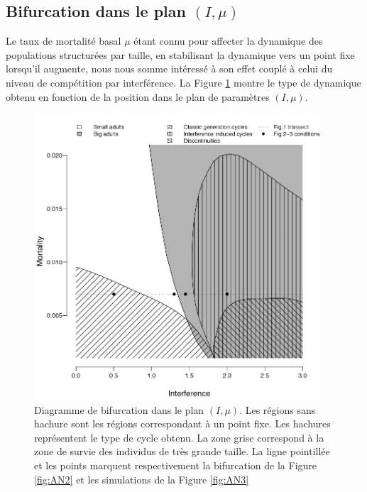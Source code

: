 \subsection{Bifurcation dans le plan $(I,\mu)$}

Le taux de mortalité basal $\mu$ étant connu pour affecter la dynamique des
populations structurées par taille, en stabilisant la dynamique vers un point
fixe lorsqu'il augmente, nous nous somme intéressé à son effet couplé à celui du
niveau de compétition par interférence. La Figure \ref{fig:AN4} montre le type
de dynamique obtenu en fonction de la position dans le plan de paramètres
$(I,\mu)$.

\begin{figure}[!ht]
\begin{center}
\includegraphics[width=0.95\textwidth]{1_CorpsDeThese/Resumes/Fig/AN05}
\caption[Diagramme de
bifurcation dans le plan $(I,\mu)$]{Diagramme de
bifurcation dans le plan $(I,\mu)$. Les régions sans hachure sont les régions
correspondant à un point fixe. Les hachures représentent le type de cycle
obtenu. La zone grise correspond à la zone de survie des individus de très
grande taille. La ligne pointillée et les points marquent respectivement la
bifurcation de la Figure \ref{fig:AN2} et les simulations de la Figure
\ref{fig:AN3}}
\label{fig:AN4}
\end{center}
\end{figure}

